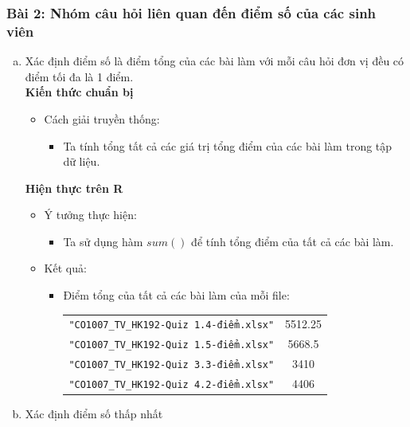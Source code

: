 \documentclass[a4paper]{article}
\theoremstyle{definition}
\begin{document}
\subsubsection*{Bài 2: Nhóm câu hỏi liên quan đến điểm số của các sinh viên}
\begin{enumerate}[a)]
    \bf\item {Xác định điểm số là điểm tổng của các bài làm với mỗi câu hỏi đơn vị đều có điểm tối đa là 1 điểm.}\\[6pt]
    \bf Kiến thức chuẩn bị\normalfont
    \begin{itemize}
        \item Cách giải truyền thống:
        \begin{itemize}
            \item Ta tính tổng tất cả các giá trị tổng điểm của các bài làm trong tập dữ liệu.
        \end{itemize}
    \end{itemize}
    \bf Hiện thực trên R\normalfont
    \begin{itemize}
        \item Ý tưởng thực hiện:
        \begin{itemize}
            \item Ta sử dụng hàm $sum()$ để tính tổng điểm của tất cả các bài làm.
        \end{itemize}
        \item Kết quả:
        \begin{itemize}
            \item Điểm tổng của tất cả các bài làm của mỗi file:
            \begin{center}
                \begin{tabular}{l c}
                     \texttt{"CO1007\_TV\_HK192-Quiz 1.4-điểm.xlsx"} & 5512.25\\
                     \texttt{"CO1007\_TV\_HK192-Quiz 1.5-điểm.xlsx"} & 5668.5\\
                     \texttt{"CO1007\_TV\_HK192-Quiz 3.3-điểm.xlsx"} & 3410\\
                     \texttt{"CO1007\_TV\_HK192-Quiz 4.2-điểm.xlsx"} & 4406
                \end{tabular}
            \end{center}
        \end{itemize}   
    \end{itemize}
    \bf\item {Xác định điểm số thấp nhất}\\[6pt]

\end{enumerate}
\end{document}
